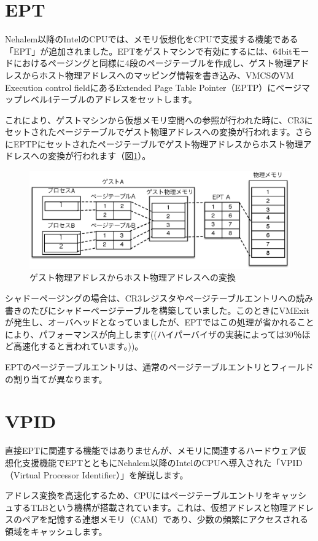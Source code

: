 \documentclass[a4j,12pt]{jarticle}
\begin{document}
\section{EPT}
Nehalem以降のIntelのCPUでは、メモリ仮想化をCPUで支援する機能である「EPT」が追加されました。EPTをゲストマシンで有効にするには、64bitモードにおけるページングと同様に4段のページテーブルを作成し、ゲスト物理アドレスからホスト物理アドレスへのマッピング情報を書き込み、VMCSのVM Execution control fieldにあるExtended Page Table Pointer（EPTP）にページマップレベル4テーブルのアドレスをセットします。

これにより、ゲストマシンから仮想メモリ空間への参照が行われた時に、CR3にセットされたページテーブルでゲスト物理アドレスへの変換が行われます。さらにEPTPにセットされたページテーブルでゲスト物理アドレスからホスト物理アドレスへの変換が行われます（図\ref{fig7}）。

\begin{figure}
\includegraphics{figures/part2_fig7.eps}
\caption{ゲスト物理アドレスからホスト物理アドレスへの変換}
\label{fig7}
\end{figure}

シャドーページングの場合は、CR3レジスタやページテーブルエントリへの読み書きのたびにシャドーページテーブルを構築していました。このときにVMExitが発生し、オーバヘッドとなっていましたが、EPTではこの処理が省かれることにより、パフォーマンスが向上します((ハイパーバイザの実装によっては30％ほど高速化すると言われています。))。

EPTのページテーブルエントリは、通常のページテーブルエントリとフィールドの割り当てが異なります。

\section{VPID}
直接EPTに関連する機能ではありませんが、メモリに関連するハードウェア仮想化支援機能でEPTとともにNehalem以降のIntelのCPUへ導入された「VPID（Virtual Processor Identifier）」を解説します。

アドレス変換を高速化するため、CPUにはページテーブルエントリをキャッシュするTLBという機構が搭載されています。これは、仮想アドレスと物理アドレスのペアを記憶する連想メモリ（CAM）であり、少数の頻繁にアクセスされる領域をキャッシュします。
\end{document}

